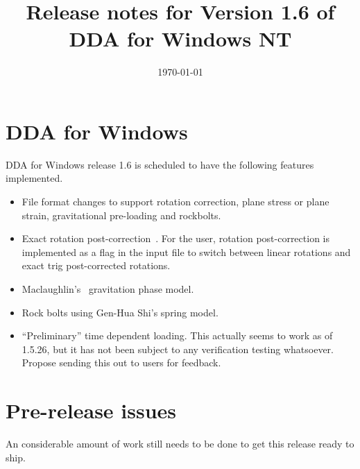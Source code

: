 \documentclass{article}
\begin{document}
\title{Release notes for Version 1.6 of DDA
for Windows NT}
\date{\today}
\author{}
\maketitle

\section*{DDA for Windows}

DDA for Windows release 1.6 is scheduled to have the following
features implemented.



\begin{itemize}


\item File format changes to support rotation 
correction, plane stress or plane strain,
gravitational pre-loading and rockbolts.

\item Exact rotation post-correction~\cite{maclaughlin:mm97}.
For the user, rotation post-correction is implemented as a flag 
in the input file to switch between linear rotations and exact trig 
post-corrected rotations. 

\item Maclaughlin's~\citeyear{maclaughlin:mm97} gravitation phase
model.

\item Rock bolts using Gen-Hua Shi's spring model.

\item  ``Preliminary'' time dependent loading.  
This actually seems to work
as of 1.5.26, but it has not been subject to any verification 
testing whatsoever.  Propose sending this out to 
users for feedback.


\end{itemize}


\section*{Pre-release issues}

An considerable amount of work still needs to be done to get this 
release ready to ship.   
\end{document}
